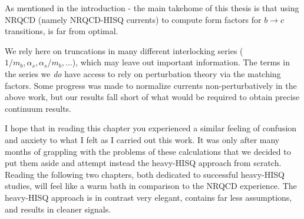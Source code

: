 As mentioned in the introduction - the main takehome of this thesis is that using NRQCD (namely NRQCD-HISQ currents) to compute form factors for $b\to c$ transitions, is far from optimal. 

We rely here on truncations in many different interlocking series ($1/m_b, \alpha_s,\alpha_s/m_b,...$), which may leave out important information. The terms in the series we {\textit{do}} have access to rely on perturbation theory via the matching factors. Some progress was made to normalize currents non-perturbatively in the above work, but our results fall short of what would be required to obtain precise continuum results.

I hope that in reading this chapter you experienced a similar feeling of confusion and anxiety to what I felt as I carried out this work. It was only after many months of grappling with the problems of these calculations that we decided to put them aside and attempt instead the heavy-HISQ approach from scratch. Reading the following two chapters, both dedicated to successful heavy-HISQ studies, will feel like a warm bath in comparison to the NRQCD experience. The heavy-HISQ approach is in contrast very elegant, contains far less assumptions, and results in cleaner signals.
